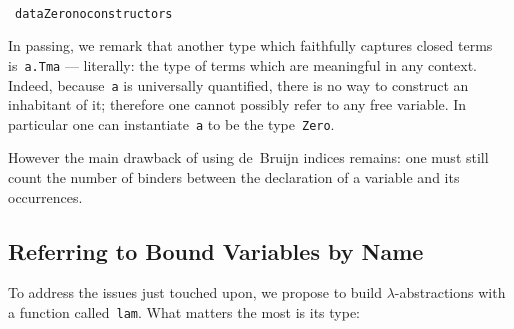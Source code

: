 \documentclass[9pt,preprint,authoryear]{sigplanconf}
\begin{document}
{\nopagebreak }

%
%
%
~\\~\vphantom{$\{$}\textcolor[cmyk]{0,0.65,0.99,0}{\texttt{data}}\textcolor[rgb]{0,0,0.80}{\texttt{\mbox{\hspace{0.50em}}}}\textcolor[rgb]{0,0,0.80}{\texttt{Zero}}\textcolor[rgb]{0,0,0.80}{\texttt{\mbox{\hspace{0.50em}}}}\textcolor[rgb]{0.63,0.13,0.94}{\texttt{\makebox[1.22ex][c]{-}\makebox[1.22ex][c]{-}\mbox{\hspace{0.50em}}no\mbox{\hspace{0.50em}}constructors}}\textcolor[rgb]{0,0,0.80}{\texttt{{\nopagebreak \newline%
}\vphantom{$\{$}}}%


%
In passing, we remark that another type which faithfully captures
    closed terms is{~}\textcolor[cmyk]{0,0.65,0.99,0}{\texttt{\makebox[1.22ex][c]{$ \forall $}}}\textcolor[rgb]{0,0,0.80}{\texttt{\mbox{\hspace{0.50em}}}}\textcolor[rgb]{0,0,0.80}{\texttt{a}}\textcolor[cmyk]{0,0.65,0.99,0}{\texttt{.}}\textcolor[rgb]{0,0,0.80}{\texttt{\mbox{\hspace{0.50em}}}}\textcolor[rgb]{0,0,0.80}{\texttt{Tm}}\textcolor[rgb]{0,0,0.80}{\texttt{\mbox{\hspace{0.50em}}}}\textcolor[rgb]{0,0,0.80}{\texttt{a}} --- literally{:} the type of terms which
    are meaningful in any context.
    Indeed, because{~}\textcolor[rgb]{0,0,0.80}{\texttt{a}} is universally quantified, there is no way
    to construct an inhabitant of it; therefore one cannot possibly refer to any
    free variable. In particular one can instantiate{~}\textcolor[rgb]{0,0,0.80}{\texttt{a}} to be the
    type{~}\textcolor[rgb]{0,0,0.80}{\texttt{Zero}}.%


%
However the main drawback of using de{~}Bruijn indices remains{:} one must still
    count the number of binders between the declaration of a variable and its occurrences.%


\subsection{Referring to Bound Variables by Name}

%
To address the issues just touched upon, we
    propose to build $ \lambda $-abstractions with a function called{~}\textcolor[rgb]{0,0,0.80}{\texttt{lam}}. What
    matters the most is its type{:}%
\end{document}

